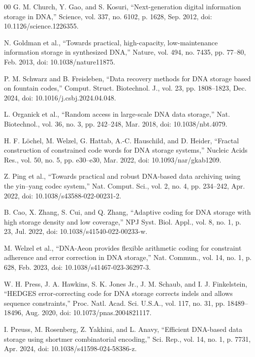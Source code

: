 \documentclass[conference]{IEEEtran}
\begin{document}
\begin{thebibliography}{00}
 G. M. Church, Y. Gao, and S. Kosuri, ``Next-generation digital information storage in DNA,'' Science, vol. 337, no. 6102, p. 1628, Sep. 2012, doi: 10.1126/science.1226355.

 N. Goldman et al., ``Towards practical, high-capacity, low-maintenance information storage in synthesized DNA,'' Nature, vol. 494, no. 7435, pp. 77--80, Feb. 2013, doi: 10.1038/nature11875.

 P. M. Schwarz and B. Freisleben, ``Data recovery methods for DNA storage based on fountain codes,'' Comput. Struct. Biotechnol. J., vol. 23, pp. 1808--1823, Dec. 2024, doi: 10.1016/j.csbj.2024.04.048.

 L. Organick et al., ``Random access in large-scale DNA data storage,'' Nat. Biotechnol., vol. 36, no. 3, pp. 242--248, Mar. 2018, doi: 10.1038/nbt.4079.

 H. F. L\"ochel, M. Welzel, G. Hattab, A.-C. Hauschild, and D. Heider, ``Fractal construction of constrained code words for DNA storage systems,'' Nucleic Acids Res., vol. 50, no. 5, pp. e30--e30, Mar. 2022, doi: 10.1093/nar/gkab1209.

 Z. Ping et al., ``Towards practical and robust DNA-based data archiving using the yin--yang codec system,'' Nat. Comput. Sci., vol. 2, no. 4, pp. 234--242, Apr. 2022, doi: 10.1038/s43588-022-00231-2.

 B. Cao, X. Zhang, S. Cui, and Q. Zhang, ``Adaptive coding for DNA storage with high storage density and low coverage,'' NPJ Syst. Biol. Appl., vol. 8, no. 1, p. 23, Jul. 2022, doi: 10.1038/s41540-022-00233-w.

 M. Welzel et al., ``DNA-Aeon provides flexible arithmetic coding for constraint adherence and error correction in DNA storage,'' Nat. Commun., vol. 14, no. 1, p. 628, Feb. 2023, doi: 10.1038/s41467-023-36297-3.

 W. H. Press, J. A. Hawkins, S. K. Jones Jr., J. M. Schaub, and I. J. Finkelstein, ``HEDGES error-correcting code for DNA storage corrects indels and allows sequence constraints,'' Proc. Natl. Acad. Sci. U.S.A., vol. 117, no. 31, pp. 18489--18496, Aug. 2020, doi: 10.1073/pnas.2004821117.

 I. Preuss, M. Rosenberg, Z. Yakhini, and L. Anavy, ``Efficient DNA-based data storage using shortmer combinatorial encoding,'' Sci. Rep., vol. 14, no. 1, p. 7731, Apr. 2024, doi: 10.1038/s41598-024-58386-z.


\end{thebibliography}
\end{document}
